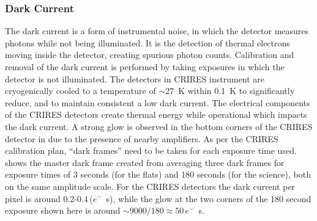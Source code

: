 \subsubsection{Dark Current}
\label{subsubsec:darkcurrent}
The dark current is a form of instrumental noise, in which the detector measures photons while not being illuminated. It is the detection of thermal electrons moving inside the detector, creating spurious photon counts. Calibration and removal of the dark current is performed by taking exposures in which the detector is not illuminated.
The detectors in CRIRES instrument are cryogenically cooled to a temperature of $\sim27$~K within 0.1~K to significantly reduce, and to maintain consistent a low dark current. The electrical components of the CRIRES detectors create thermal energy while operational which impacts the dark current. A strong glow is observed in the bottom corners of the CRIRES detector in  due to the presence of nearby amplifiers. As per the CRIRES calibration plan, ``dark frames'' need to be taken for each exposure time used.  shows the master dark frame created from averaging three dark frames for exposure times of 3 seconds (for the flats) and 180 seconds (for the science), both on the same amplitude scale.
For the CRIRES detectors the dark current per pixel is around 0.2-0.4\,(\(e^{-}\)\si{\per\second}), while the glow at the two corners of the 180 second exposure shown here is around \(\sim9000 / 180\approx50\)\,\(e^{-}\)\si{\per\second}.

%


